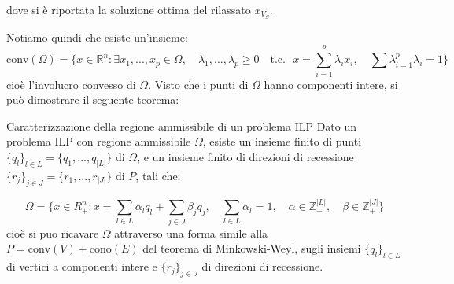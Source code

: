 \documentclass[a4paper,11pt]{article}
\begin{document}
\begin{center}


\end{center}
dove si è riportata la soluzione ottima del rilassato $x_{V_S}$.

Notiamo quindi che esiste un'insieme:
$$
\mathrm{conv} (\Omega) = \{ x \in \mathbb{R}^n : \exists x_1, ..., x_p \in \Omega, \quad \lambda_1, ..., \lambda_p \geq 0 \quad \text{t.c.} \ \ \ x = \sum_{i=1}^p  \lambda_i x_i, \quad \sum \lambda_{i=1}^p  \lambda_i = 1 \}
$$
cioè l'involucro convesso di $\Omega$.
Visto che i punti di $\Omega$ hanno componenti intere, si può dimostrare il seguente teorema:
\begin{theorem}{Caratterizzazione della regione ammissibile di un problema ILP}
	Dato un problema ILP con regione ammissibile $\Omega$, esiste un insieme finito di punti $\{ q_l \}_{l \in L} = \{ q_1, ..., q_{|L|} \}$ di $\Omega$, e un insieme finito di direzioni di recessione $\{ r_j \}_{j \in J} = \{ r_1, ..., r_|J| \}$ di $P$, tali che:

$$ 
\Omega = \{ x \in R^n_+: x = \sum_{l\in L} \alpha_l q_l + \sum_{j\in J} \beta_j q_j, \quad \sum_{l \in L} \alpha_l = 1, \quad \alpha \in \mathbb{Z}^{|L|}_+, \quad \beta \in \mathbb{Z}^{|J|}_+ \}
$$
cioè si puo ricavare $\Omega$ attraverso una forma simile alla $P = \mathrm{conv}(V) + \mathrm{cono}(E)$ del teorema di Minkowski-Weyl, sugli insiemi $\{ q_l \}_{l \in L}$ di vertici a componenti intere e $\{ r_j \}_{j \in J}$ di direzioni di recessione.
\end{theorem}
\end{document}
